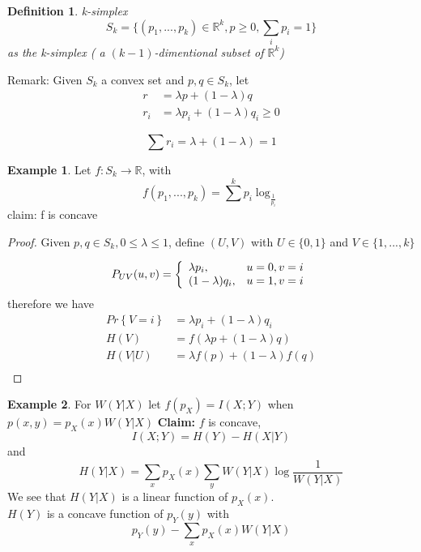 \documentclass[twoside]{article}
\newtheorem{definition}{Definition}[section]
\theoremstyle{definition} %
\newtheorem{example}{Example}
\renewcommand{\Pr}[1]{Pr\left\{#1\right\}}
\def\R{\mathbb{R}}
\begin{document}
\begin{appendices}
\begin{definition}{k-simplex}
\[ S_k = \{(p_1, ..., p_k) \in \R^k , p \geq 0, \sum_i p_i = 1 \} \]
as the k-simplex ( a $(k-1)$-dimentional subset of $\R^k$)
\end{definition}

Remark:
Given $S_k$ a convex set and $p,q \in S_k$, let
\begin{align*}
  r   &= \lambda p + (1 - \lambda)q \\
  r_i &= \lambda p_i + (1 - \lambda) q_i \geq 0
\end{align*}

\[ \sum r_i = \lambda + (1 - \lambda) = 1 \]

\begin{example}
  Let $f : S_k \rightarrow \R $, with
  \[ f(p_1, ..., p_k) = \sum^k p_i \log_{\frac{1}{p_i}} \]
  claim: f is concave

  \begin{proof}
    Given $p, q \in S_k, 0 \leq \lambda \leq 1$, define $(U, V)$ with $U \in \{0, 1\}$ and $V \in \{1, ..., k\}$

    \begin{align*}
      P_{UV}(u, v) =
      \left\{
      \begin{array}{l l}
        \lambda p_i, & u=0, v=i \\
        (1 - \lambda)q_i, & u=1, v=i
      \end{array}
      \right.
    \end{align*}
    therefore we have
    \begin{align*}
      \Pr{V = i} &= \lambda p_i + (1 - \lambda) q_i \\
      H(V) &= f(\lambda p + (1 - \lambda) q) \\
      H(V | U) &= \lambda f(p) + (1 - \lambda) f(q) \\
    \end{align*}
  \end{proof}
\end{example}


\begin{example}
  For $W(Y | X)$ let $f(p_X) = I(X ; Y)$ when $p(x, y) = p_X(x) W(Y | X) $
  \textbf{Claim:} $f$ is concave,
  \[ I(X ; Y) = H(Y) - H(X | Y) \]
  and
  \[ H(Y|X) = \sum_x p_X(x) \sum_y W(Y|X) \log \frac{1}{W(Y | X)} \]
  We see that $H(Y|X)$ is a linear function of $p_X(x)$.\\
  $H(Y)$ is a concave function of $p_Y(y)$ with
  \[ p_Y(y) - \sum_x p_X(x) W(Y|X) \]


\end{example}
\end{appendices}
\end{document}
